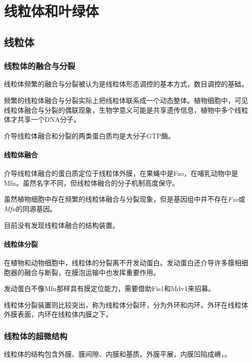 \section{线粒体和叶绿体}

\subsection{线粒体}

\subsubsection{线粒体的融合与分裂}

线粒体频繁的融合与分裂被认为是线粒体形态调控的基本方式，数目调控的基础。

频繁的线粒体融合与分裂实际上把线粒体联系成一个动态整体。植物细胞中，可见线粒体融合与分裂的偶联现象，生物学意义可能是共享遗传信息，植物中多个线粒体才共享一个DNA分子。

介导线粒体融合和分裂的两类蛋白质均是大分子GTP酶。

\paragraph{线粒体融合}

介导线粒体融合的蛋白质定位于线粒体外膜，在果蝇中是Fzo，在哺乳动物中是Mfn。虽然名字不同，但线粒体融合的分子机制高度保守。

虽然植物细胞中存在频繁的线粒体融合与分裂现象，但是基因组中并不存在\textit{Fzo}或\textit{Mfn}的同源基因。

目前没有发现线粒体融合的结构装置。

\paragraph{线粒体分裂}

在植物和动物细胞中，线粒体的分裂离不开发动蛋白。发动蛋白还介导许多膜相细胞器的融合与断裂，在膜泡运输中也发挥重要作用。

发动蛋白不像Mfn那样具有膜定位能力，需要借助Fis1和Mdv1来招募。

线粒体分裂装置则比较突出，称为线粒体分裂环，分为外环和内环。外环在线粒体外膜表面，内环在线粒体内膜之下。

\subsubsection{线粒体的超微结构}

线粒体的结构包含外膜、膜间隙、内膜和基质。外膜平展，内膜凹陷成嵴，。

